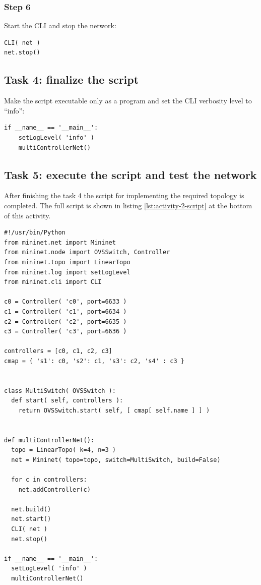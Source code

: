 \subsubsection*{Step 6}
Start the CLI and stop the network:
\begin{lstlisting}
CLI( net )
net.stop()
\end{lstlisting}




\subsection*{Task 4: finalize the script}
Make the script executable only as a program and set the CLI verbosity level
to ``info'':
\begin{lstlisting}
if __name__ == '__main__':
    setLogLevel( 'info' )
    multiControllerNet()
\end{lstlisting}






\subsection*{Task 5: execute the script and test the network}
After finishing the task 4 the script for implementing the required topology is
completed. The full script is shown in listing \ref{lst:activity-2-script} at the
bottom of this activity.



\begin{minipage}{\linewidth}
\begin{lstlisting}[label=lst:activity-2-script, caption=complete Python script required for Activity 2]
#!/usr/bin/Python
from mininet.net import Mininet
from mininet.node import OVSSwitch, Controller
from mininet.topo import LinearTopo
from mininet.log import setLogLevel
from mininet.cli import CLI

c0 = Controller( 'c0', port=6633 )
c1 = Controller( 'c1', port=6634 )
c2 = Controller( 'c2', port=6635 )
c3 = Controller( 'c3', port=6636 )

controllers = [c0, c1, c2, c3]
cmap = { 's1': c0, 's2': c1, 's3': c2, 's4' : c3 }


class MultiSwitch( OVSSwitch ):
  def start( self, controllers ):
    return OVSSwitch.start( self, [ cmap[ self.name ] ] )


def multiControllerNet():
  topo = LinearTopo( k=4, n=3 )
  net = Mininet( topo=topo, switch=MultiSwitch, build=False)

  for c in controllers:
    net.addController(c)

  net.build()
  net.start()
  CLI( net )
  net.stop()

if __name__ == '__main__':
  setLogLevel( 'info' )
  multiControllerNet()
\end{lstlisting}
\end{minipage}
